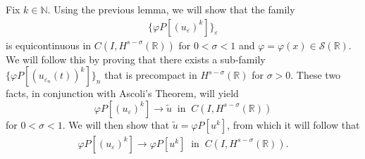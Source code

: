 \documentclass{beamer}
\newcommand{\rr}{\mathbb{R}}
\newcommand{\ee}{\varepsilon}
\begin{document}
\begin{frame}
Fix $k \in \mathbb{N}$. Using the previous lemma, we
will show that the family
\begin{equation*}
\begin{split}
\{\varphi P[(u_\ee)^k]\}_\ee
\end{split}
\end{equation*}
is equicontinuous in $C(I, H^{s-\sigma}(\rr))$ 
for $0 < \sigma < 1$ and $\varphi = \varphi(x) \in \mathcal{S}(\rr)$.
We will follow this by proving that
there exists a sub-family $\{\varphi P[(u_{\ee_n}(t))^k]\}_n$
that is precompact in $H^{s-\sigma}(\rr)$ for $\sigma > 0$. 
These two facts, in conjunction with Ascoli's Theorem, will
yield
\begin{equation*}
\label{hhstrong-conv2}
\varphi P[(u_\ee)^k] \to \tilde{u}
\; \; \text{in} \; \; C(I,H^{s-\sigma}(\rr))
\end{equation*}
for $0 < \sigma < 1$.
We will then show that $\tilde{u} = \varphi P[u^k]$, from which it will
follow that
\begin{equation*}
\label{hhphiplus}
\begin{split}
\varphi P[(u_\ee)^k] \to \varphi P[u^k]
\; \; \text{in} \; \; C(I,H^{s-\sigma}(\rr)).
\end{split}
\end{equation*}
\end{frame}



%
%
%
%
\end{document}
